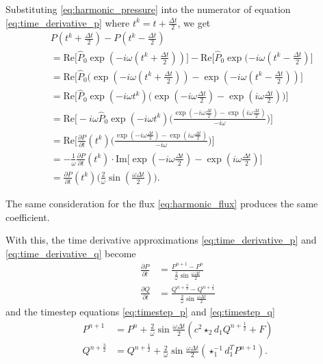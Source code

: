 \documentclass[utf8,english]{gradu3}
\begin{document}
Substituting \eqref{eq:harmonic_pressure}
into the numerator of equation \eqref{eq:time_derivative_p}
where $t^k = t + \frac{\Delta t}{2}$, we get
\begin{align*}
& P(t^k + \frac{\Delta t}{2}) - P(t^k - \frac{\Delta t}{2}) \\
&= \text{Re} \Big[ \hat{P}_0 \exp(-i\omega (t^k + \frac{\Delta t}{2})) \Big]
- \text{Re} \Big[ \hat{P}_0 \exp(-i\omega (t^k - \frac{\Delta t}{2}) \Big] \\
&= \text{Re} \Big[ \hat{P}_0 (\exp(-i\omega (t^k + \frac{\Delta t}{2}))
- \exp(-i\omega (t^k - \frac{\Delta t}{2})) \Big] \\
&= \text{Re} \Big[ \hat{P}_0 \exp(-i\omega t^k)
\Big( \exp(-i\omega \frac{\Delta t}{2}) - \exp(i\omega \frac{\Delta t}{2}) \Big) \Big] \\
&= \text{Re} \Big[ -i\omega \hat{P}_0 \exp(-i\omega t^k)
\Big(\frac{\exp(-i\omega \frac{\Delta t}{2}) - \exp(i\omega \frac{\Delta t}{2})}{-i\omega}\Big) \Big] \\
&= \text{Re} \Big[ \frac{\partial P}{\partial t}(t^k)
\Big(\frac{\exp(-i\omega \frac{\Delta t}{2}) - \exp(i\omega \frac{\Delta t}{2})}{-i\omega}\Big) \Big] \\
&= - \frac{1}{\omega} \frac{\partial P}{\partial t}(t^k)
\cdot \text{Im} \Big[\exp(-i\omega \frac{\Delta t}{2}) - \exp(i\omega \frac{\Delta t}{2}) \Big] \\
&= \frac{\partial P}{\partial t}(t^k) \Big(\frac{2}{\omega} \sin(\frac{\omega \Delta t}{2}) \Big).
\end{align*}

The same consideration for the flux \eqref{eq:harmonic_flux}
produces the same coefficient.

With this, the time derivative approximations \eqref{eq:time_derivative_p}
and \eqref{eq:time_derivative_q} become
\begin{align}
\label{eq:time_derivative_p_har}
\frac{\partial P}{\partial t}
&= \frac{P^{n+1} - P^n}{\frac{2}{\omega}\sin\frac{\omega \Delta t}{2}} \\
\label{eq:time_derivative_q_har}
\frac{\partial Q}{\partial t}
&= \frac{Q^{n+\frac{3}{2}} - Q^{n+\frac{1}{2}}}{\frac{2}{\omega}\sin\frac{\omega \Delta t}{2}}
\end{align}
and the timestep equations \eqref{eq:timestep_p} and \eqref{eq:timestep_q}
\begin{align}
\label{eq:timestep_p_har}
P^{n+1} &= P^n
+ \frac{2}{\omega}\sin\frac{\omega \Delta t}{2} (c^2 \star_2 d_1 Q^{n+\frac{1}{2}} + F) \\
\label{eq:timestep_q_har}
Q^{n+\frac{3}{2}} &= Q^{n+\frac{1}{2}}
+ \frac{2}{\omega}\sin\frac{\omega \Delta t}{2} (\star_1^{-1} d_1^T P^{n+1}).
\end{align}
\end{document}
